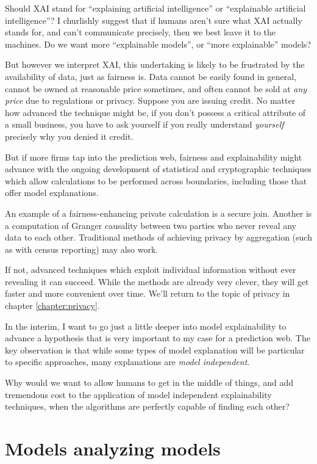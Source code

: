 Should XAI stand for ``explaining artificial intelligence'' or ``explainable artificial intelligence''? I churlishly suggest that if humans aren't sure what XAI actually stands for, and can't communicate precisely, then we best leave it to the machines. Do we want more ``explainable models'', or ``more explainable'' models?

But however we interpret XAI, this undertaking is likely to be frustrated by the availability of data, just as fairness is. Data cannot be easily found in general, cannot be owned at reasonable price sometimes, and often cannot be sold at {\em any price} due to regulations or privacy. Suppose you are issuing credit. No matter how advanced the technique might be, if you don't possess a critical attribute of a small business, you have to ask yourself if you really understand {\em yourself} precisely why you denied it credit. 

But if more firms tap into the prediction web, fairness and explainability might advance with the ongoing development of statistical and cryptographic techniques which allow calculations to be performed across boundaries, including those that offer model explanations.  

An example of a fairness-enhancing private calculation is a secure join. Another is a computation of Granger causality between two parties who never reveal any data to each other. Traditional methods of achieving privacy by aggregation (such as with census reporting) may also work. 

If not, advanced techniques which exploit individual information without ever revealing it can succeed. While the methods are already very clever, they will get faster and more convenient over time. We'll return to the topic of privacy in chapter \ref{chapter:privacy}.

In the interim, I want to go just a little deeper into model explainability to advance a hypothesis that is very important to my case for a prediction web. The key observation is that while some types of model explanation will be particular to specific approaches, many explanations are {\em model independent}. 

Why would we want to allow humans to get in the middle of things, and add tremendous cost to the application of model independent explainability techniques, when the algorithms are perfectly capable of finding each other? 

\section{Models analyzing models }

